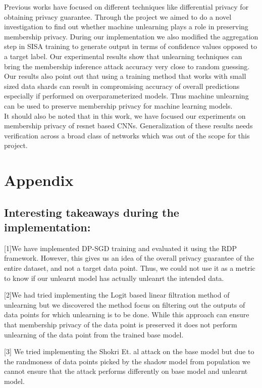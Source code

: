 \documentclass[11pt,letterpaper]{article}
\begin{document}
Previous works have focused on different techniques like differential privacy for obtaining privacy guarantee. Through the project we aimed to do a novel investigation to find out whether machine unlearning plays a role in preserving membership privacy. During our implementation we also modified the aggregation step in SISA training to generate output in terms of confidence values opposed to a target label. Our experimental results show that unlearning techniques can bring the membership inference attack accuracy very close to random guessing.  Our results also point out that using a training method that works with small sized data shards can result in compromising accuracy of overall predictions especially if performed on overparameterized models. Thus machine unlearning can be used to preserve membership privacy for machine learning models.
\\
It should also be noted that in this work, we have focused our experiments on membership privacy of resnet based CNNs. Generalization of these results needs verification across a broad class of networks which was out of the scope for this project.  

\newpage
\newpage


\newpage
\section{Appendix}
\subsection{Interesting takeaways during the implementation:}

[1]We have implemented DP-SGD training and evaluated it using the RDP framework. However, this gives us an idea of the overall privacy guarantee of the entire dataset, and not a target data point. Thus, we could not use it as a metric to know if our unlearnt model has actually unleanrt the intended data. 

[2]We had tried implementing the Logit based linear filtration method of unlearning but we discovered the method focus on filtering out the outputs of data points for which unlearning is to be done. While this approach can ensure that membership privacy of the data point is preserved it does not perform unlearning of the data point from the trained base model.

[3] We tried implementing the Shokri Et. al attack on the base model but due to the randmoness of data points picked by the shadow model from population we cannot ensure that the attack performs differently on base model and unlearnt model.
\end{document}
